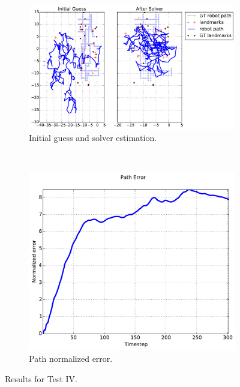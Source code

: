 {\begin{figure}[htbp!]
    \centering
    \begin{subfigure}[b]{\estWidth\textwidth}
        \includegraphics[width=\textwidth]{imagenes/tests/known/res_it_20_nl_40_op_1_oa_1_lp_1_ds_300_kw_1.pdf}
        \caption{Initial guess and solver estimation.}
        \label{fig:test-iva}
    \end{subfigure}\\
    \begin{subfigure}[b]{\errorWidth\textwidth}
        \includegraphics[width=\textwidth]{imagenes/tests/known/res_it_20_nl_40_op_1_oa_1_lp_1_ds_300_kw_1_path.pdf}
        \caption{Path normalized error.}
        \label{fig:test-ivb}
    \end{subfigure}
    \caption{Results for Test IV.}
    \label{fig:test-iv}
\end{figure}
}

